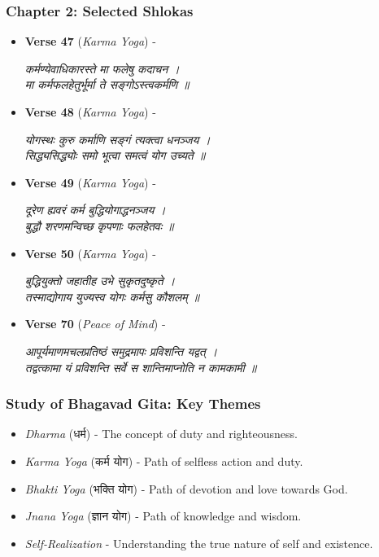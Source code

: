 \begin{frame}[fragile]\frametitle{Chapter 2: Selected Shlokas}

      \begin{itemize}
		\item \textbf{Verse 47} (\textit{Karma Yoga}) - 
		
			\textit{कर्मण्येवाधिकारस्ते मा फलेषु कदाचन ।} \\
			\textit{मा कर्मफलहेतुर्भूर्मा ते सङ्गोऽस्त्वकर्मणि ॥}
		
		\item \textbf{Verse 48} (\textit{Karma Yoga}) - 
		
			\textit{योगस्थः कुरु कर्माणि सङ्गं त्यक्त्वा धनञ्जय ।} \\
			\textit{सिद्ध्यसिद्ध्योः समो भूत्वा समत्वं योग उच्यते ॥}
		
		\item \textbf{Verse 49} (\textit{Karma Yoga}) - 
		
			\textit{दूरेण ह्यवरं कर्म बुद्धियोगाद्धनञ्जय ।} \\
			\textit{बुद्धौ शरणमन्विच्छ कृपणाः फलहेतवः ॥}
		
		\item \textbf{Verse 50} (\textit{Karma Yoga}) - 
		
			\textit{बुद्धियुक्तो जहातीह उभे सुकृतदुष्कृते ।} \\
				\textit{तस्माद्योगाय युज्यस्व योगः कर्मसु कौशलम् ॥}
		
		\item \textbf{Verse 70} (\textit{Peace of Mind}) - 
		
			\textit{आपूर्यमाणमचलप्रतिष्ठं समुद्रमापः प्रविशन्ति यद्वत् ।} \\
			\textit{तद्वत्कामा यं प्रविशन्ति सर्वे स शान्तिमाप्नोति न कामकामी ॥}
		
	  \end{itemize}

\end{frame}

\begin{frame}[fragile]\frametitle{Study of Bhagavad Gita: Key Themes}

      \begin{itemize}
		\item \textit{Dharma} (धर्म) - The concept of duty and righteousness.
		\item \textit{Karma Yoga} (कर्म योग) - Path of selfless action and duty.
		\item \textit{Bhakti Yoga} (भक्ति योग) - Path of devotion and love towards God.
		\item \textit{Jnana Yoga} (ज्ञान योग) - Path of knowledge and wisdom.
		\item \textit{Self-Realization} - Understanding the true nature of self and existence.
	  \end{itemize}

\end{frame}


